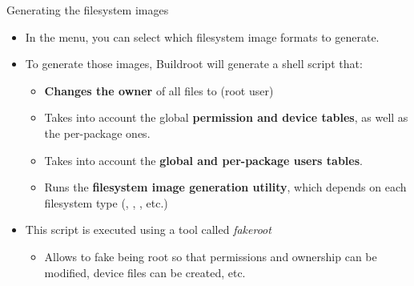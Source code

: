 \begin{frame}{Generating the filesystem images}

  \begin{itemize}
  \item In the  menu, you can select which
    filesystem image formats to generate.
  \item To generate those images, Buildroot will generate a shell
    script that:
    \begin{itemize}
    \item {\bf Changes the owner} of all files to  (root user)
    \item Takes into account the global {\bf permission and device tables},
      as well as the per-package ones.
    \item Takes into account the {\bf global and per-package users
        tables}.
    \item Runs the {\bf filesystem image generation utility}, which
      depends on each filesystem type (,
      , , etc.)
    \end{itemize}
  \item This script is executed using a tool called {\em fakeroot}
    \begin{itemize}
    \item Allows to fake being root so that permissions and ownership
      can be modified, device files can be created, etc.
    \end{itemize}
  \end{itemize}
\end{frame}

